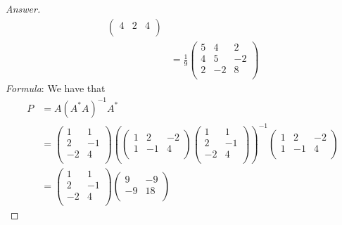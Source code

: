 \documentclass[../psets.tex]{subfiles}
\begin{document}
\begin{enumerate}[label={\textbf{4.\arabic*.}}]
\begin{proof}[Answer]
\begin{align*}
\begin{pmatrix}
                4 & 2 & 4\\
            \end{pmatrix}\\
            &= \frac{1}{9}
            \begin{pmatrix}
                5 & 4 & 2\\
                4 & 5 & -2\\
                2 & -2 & 8\\
            \end{pmatrix}
        \end{align*}
        \emph{Formula}: We have that
        \begin{align*}
            P &= A(A^*A)^{-1}A^*\\
            &=
            \begin{pmatrix}
                1 & 1\\
                2 & -1\\
                -2 & 4\\
            \end{pmatrix}
            \left(
                \begin{pmatrix}
                    1 & 2 & -2\\
                    1 & -1 & 4\\
                \end{pmatrix}
                \begin{pmatrix}
                    1 & 1\\
                    2 & -1\\
                    -2 & 4\\
                \end{pmatrix}
            \right)^{-1}
            \begin{pmatrix}
                1 & 2 & -2\\
                1 & -1 & 4\\
            \end{pmatrix}\\
            &=
            \begin{pmatrix}
                1 & 1\\
                2 & -1\\
                -2 & 4\\
            \end{pmatrix}
            \begin{pmatrix}
                9 & -9\\
                -9 & 18\\

\end{pmatrix}
\end{align*}
\end{proof}
\end{enumerate}
\end{document}
